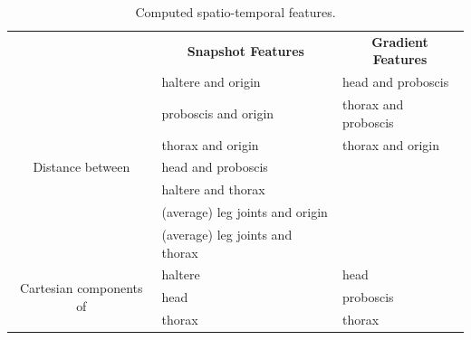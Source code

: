 \begin{table}[htb!]
	\begin{adjustbox}{width=1\textwidth}
		\begin{tabular}{c l l}
			\toprule
			                                         & \multicolumn{1}{c}{\textbf{Snapshot Features}} & \multicolumn{1}{c}{\textbf{Gradient Features}} \\
			\cmidrule(lr){2-2}\cmidrule(lr){3-3}
			\multirow{7}{*}{Distance between}        & haltere and origin                             & head and proboscis                             \\
			                                         & proboscis and origin                           & thorax and proboscis                           \\
			                                         & thorax and origin                              & thorax and origin                              \\
			                                         & head and proboscis                             &                                                \\
			                                         & haltere and thorax                             &                                                \\
			                                         & (average) leg joints and origin                &                                                \\
			                                         & (average) leg joints and thorax                &                                                \\
			\cmidrule(lr){2-2}\cmidrule(lr){3-3}
			\multirow{3}{*}{Cartesian components of} & haltere                                        & head                                           \\
			                                         & head                                           & proboscis                                      \\
			                                         & thorax                                         & thorax                                         \\
			\bottomrule
		\end{tabular}
	\end{adjustbox}
	\caption{Computed spatio-temporal features. \label{table:spatiotemporal-features}}
\end{table}

